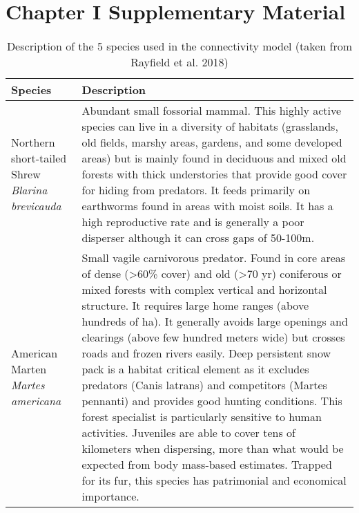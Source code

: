 
\chapter*{\textbf{Chapter I Supplementary Material \\ \hspace{1em}}}

\setcounter{chapter}{3}
\setcounter{table}{0}
\setcounter{figure}{0}


\begin{longtable}[c]{|p{5cm}|p{11cm}|}
\caption{Description of the 5 species used in the connectivity model (taken from Rayfield et al. 2018)}
\label{tab:species} \\
\hline
\hline
\textbf{Species} & \textbf{Description} \\ \hline
Northern short-tailed Shrew \newline \textit{Blarina brevicauda} & Abundant small fossorial mammal. This highly active species can live in a diversity of habitats (grasslands, old fields, marshy areas, gardens, and some developed areas) but is mainly found in deciduous and mixed old forests with thick understories that provide good cover for hiding from predators. It feeds primarily on earthworms found in areas with moist soils. It has a high reproductive rate and is generally a poor disperser although it can cross gaps of 50-100m. \\ \hline
American Marten \newline \textit{Martes americana} & Small vagile carnivorous predator. Found in core areas of dense (\textgreater{}60\% cover) and old (\textgreater{}70 yr) coniferous or mixed forests with complex vertical and horizontal structure. It requires large home ranges (above hundreds of ha). It generally avoids large openings and clearings (above few hundred meters wide) but crosses roads and frozen rivers easily. Deep persistent snow pack is a habitat critical element as it excludes predators (Canis latrans) and competitors (Martes pennanti) and provides good hunting conditions. This forest specialist is particularly sensitive to human activities. Juveniles are able to cover tens of kilometers when dispersing, more than what would be expected from body mass-based estimates. Trapped for its fur, this species has patrimonial and economical importance. \\ \hline

\end{longtable}

